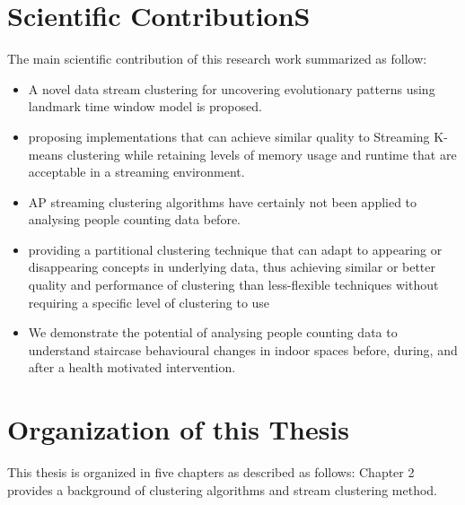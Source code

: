 


\section{Scientific ContributionS}


The main scientific contribution of this research work summarized as follow:

\begin{itemize}
    \item A novel data stream clustering for uncovering evolutionary patterns using landmark time window model is proposed. 
    \item proposing implementations that can achieve similar quality to  Streaming K-means clustering while retaining levels of memory usage and runtime that are acceptable in a streaming environment.
    \item AP streaming clustering algorithms have certainly not been applied to analysing people counting data before.
    \item  providing a partitional clustering technique that can adapt to appearing or disappearing concepts in underlying data, thus achieving similar or better quality and performance of clustering than less-flexible techniques without requiring a specific level of clustering to use
    \item We demonstrate the potential of analysing people counting data to understand staircase behavioural changes in indoor spaces before, during, and after a health motivated intervention.
\end{itemize}




\section{Organization of this Thesis}
This thesis is organized in five chapters as described as follows:
Chapter 2 provides a background of clustering algorithms and stream clustering method. 

